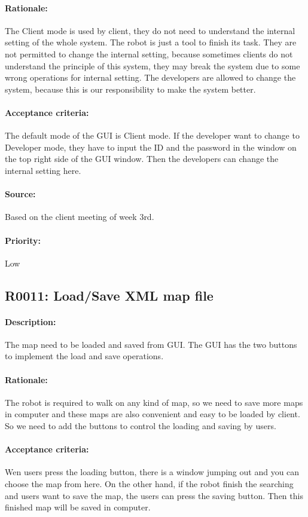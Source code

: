 \documentclass[11pt, a4paper]{report}
\begin{document}
\paragraph{Rationale:}
The Client mode is used by client, they do not need to understand the internal setting of the whole system. The robot is just a tool to finish its task. They are not permitted to change the internal setting, because sometimes clients do not understand the principle of this system, they may break the system due to some wrong operations for internal setting. The developers are allowed to change the system, because this is our responsibility to make the system better.
\paragraph{Acceptance criteria:}
The default mode of the GUI is Client mode. If the developer want to change to Developer mode, they have to input the ID and the password in the window on the top right side of the GUI window. Then the developers can change the internal setting here.
\paragraph{Source:}
Based on the client meeting of week 3rd.
\paragraph{Priority:}
Low



\subsection{R0011: Load/Save XML map file}
\paragraph{Description:}
The map need to be loaded and saved from GUI. The GUI has the two buttons to implement the load and save operations. 
\paragraph{Rationale:}
The robot is required to walk on any kind of map, so we need to save more maps in computer and these maps are also convenient and easy to be loaded by client. So we need to add the buttons to control the loading and saving by users.
\paragraph{Acceptance criteria:}
Wen users press the loading button, there is a window jumping out and you can choose the map from here. On the other hand, if the robot finish the searching and users want to save the map, the users can press the saving button. Then this finished map will be saved in computer.
\end{document}
